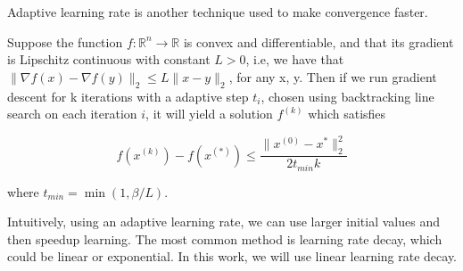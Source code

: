 Adaptive learning rate is another technique used to make convergence faster.


\begin{gdconv}
	Suppose the function $f : \mathbb{R}^{n} \rightarrow \mathbb{R}$ is convex and differentiable, and that its gradient is Lipschitz continuous with constant $L > 0$, i.e, we have that $\lVert \nabla f(x) - \nabla f(y) \rVert_{2} \leq L\lVert x - y \rVert_{2}$, for any x, y. Then if we run gradient descent for k iterations with a adaptive step $t_{i}$, chosen using backtracking line search on each iteration $i$, it will yield a solution $f^{(k)}$ which satisfies
	
	\begin{equation}
	f(x^{(k)}) - f(x^{(*)}) \leq \frac{\lVert x^{(0)} - x^{*} \rVert^{2}_{2}}{2t_{min}k} 
	\end{equation}
	
	where $t_{min} = \min({1, \beta / L})$.
\end{gdconv}


Intuitively, using an adaptive learning rate, we can use larger initial values and then speedup learning. The most common method is learning rate decay, which could be linear or exponential. In this work, we will use linear learning rate decay.